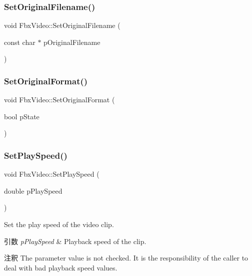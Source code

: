 \subsubsection{\texorpdfstring{Set\+Original\+Filename()}{SetOriginalFilename()}}
{\footnotesize\ttfamily void Fbx\+Video\+::\+Set\+Original\+Filename (\begin{DoxyParamCaption}\item[{const char $\ast$}]{p\+Original\+Filename }\end{DoxyParamCaption})}

\mbox{\label{class_fbx_video_afc417f0c646bf474cbe976eb76d01099}} 
\subsubsection{\texorpdfstring{Set\+Original\+Format()}{SetOriginalFormat()}}
{\footnotesize\ttfamily void Fbx\+Video\+::\+Set\+Original\+Format (\begin{DoxyParamCaption}\item[{bool}]{p\+State }\end{DoxyParamCaption})}

\mbox{\label{class_fbx_video_a9f7fd819e6d3eeea943183264c55d357}} 
\subsubsection{\texorpdfstring{Set\+Play\+Speed()}{SetPlaySpeed()}}
{\footnotesize\ttfamily void Fbx\+Video\+::\+Set\+Play\+Speed (\begin{DoxyParamCaption}\item[{double}]{p\+Play\+Speed }\end{DoxyParamCaption})}

Set the play speed of the video clip. 
\begin{DoxyParams}{引数}
{\em p\+Play\+Speed} & Playback speed of the clip. \\
\hline
\end{DoxyParams}
\begin{DoxyRemark}{注釈}
The parameter value is not checked. It is the responsibility of the caller to deal with bad playback speed values. 
\end{DoxyRemark}
\mbox{\label{class_fbx_video_a3217bac3585954766fa2c56a10de48f3}} 
